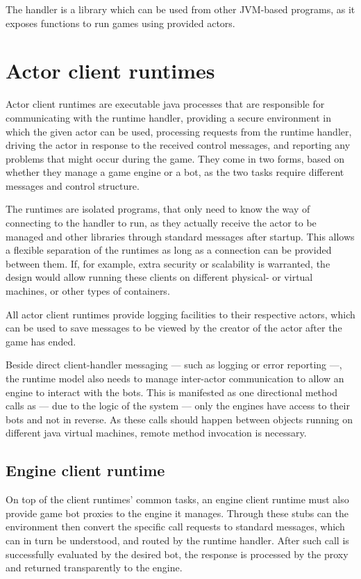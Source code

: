 	The handler is a library which can be used from other JVM-based programs, as it exposes functions to run games using provided actors.
	
	\section{Actor client runtimes}
	
	Actor client runtimes are executable java processes that are responsible for communicating with the runtime handler, providing a secure environment in which the given actor can be used, processing requests from the runtime handler, driving the actor in response to the received control messages, and reporting any problems that might occur during the game.
	They come in two forms, based on whether they manage a game engine or a bot, as the two tasks require different messages and control structure.

	 The runtimes are isolated programs, that only need to know the way of connecting to the handler to run, as they actually receive the actor to be managed and other libraries through standard messages after startup. This allows a flexible separation of the runtimes as long as a connection can be provided between them. If, for example, extra security or scalability is warranted, the design would allow running these clients on different physical- or virtual machines, or other types of containers.
	
	All actor client runtimes provide logging facilities to their respective actors, which can be used to save messages to be viewed by the creator of the actor after the game has ended.
	
	Beside direct client-handler messaging --- such as logging or error reporting ---, the runtime model also needs to manage inter-actor communication to allow an engine to interact with the bots. This is manifested as one directional method calls as --- due to the logic of the system --- only the engines have access to their bots and not in reverse.
	As these calls should happen between objects running on different java virtual machines, remote method invocation is necessary.
	
		\subsection*{Engine client runtime}
	
		On top of the client runtimes' common tasks, an engine client runtime must also provide game bot proxies to the engine it manages. Through these stubs can the environment then convert the specific call requests to standard messages, which can in turn be understood, and routed by the runtime handler. After such call is successfully evaluated by the desired bot, the response is processed by the proxy and returned transparently to the engine.
	
